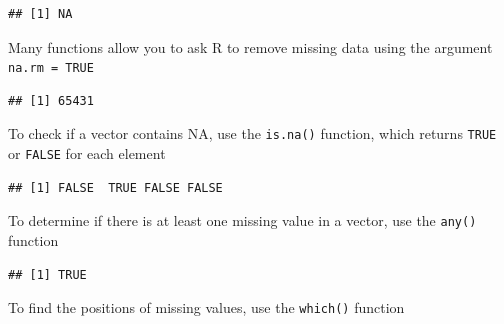 \documentclass[
]{article}
\newenvironment{Shaded}{\begin{snugshade}}{\end{snugshade}}
\newcommand{\AttributeTok}[1]{\textcolor[rgb]{0.13,0.29,0.53}{#1}}
\newcommand{\ConstantTok}[1]{\textcolor[rgb]{0.56,0.35,0.01}{#1}}
\newcommand{\FunctionTok}[1]{\textcolor[rgb]{0.13,0.29,0.53}{\textbf{#1}}}
\newcommand{\NormalTok}[1]{#1}
\newcommand{\SpecialCharTok}[1]{\textcolor[rgb]{0.81,0.36,0.00}{\textbf{#1}}}
\begin{document}
\begin{verbatim}
## [1] NA
\end{verbatim}

Many functions allow you to ask R to remove missing data using the
argument \texttt{na.rm\ =\ TRUE}

\begin{Shaded}
\end{Shaded}

\begin{verbatim}
## [1] 65431
\end{verbatim}

To check if a vector contains NA, use the \texttt{is.na()} function,
which returns \texttt{TRUE} or \texttt{FALSE} for each element

\begin{Shaded}
\end{Shaded}

\begin{verbatim}
## [1] FALSE  TRUE FALSE FALSE
\end{verbatim}

To determine if there is at least one missing value in a vector, use the
\texttt{any()} function

\begin{Shaded}
\end{Shaded}

\begin{verbatim}
## [1] TRUE
\end{verbatim}

To find the positions of missing values, use the \texttt{which()}
function

\begin{Shaded}
\end{Shaded}
\end{document}
